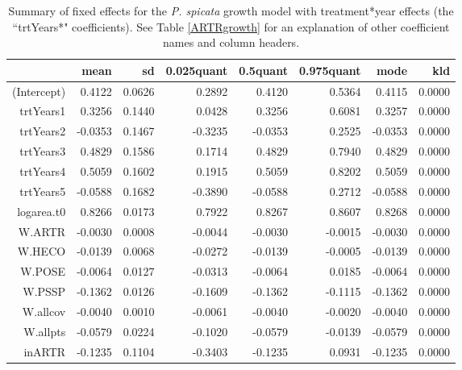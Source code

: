\documentclass[11pt]{article}
\begin{document}
\begin{table}
\centering
\caption{Summary of fixed effects for the \textit{P. spicata} growth model with treatment*year effects (the ``trtYears*" coefficients). See Table \ref{ARTRgrowth} for an explanation of other coefficient names and column headers.} 
\label{table:PSSPgrowth-trtYears}
\begin{tabular}{rrrrrrrr}
  \hline
 & mean & sd & 0.025quant & 0.5quant & 0.975quant & mode & kld \\ 
  \hline
(Intercept) & 0.4122 & 0.0626 & 0.2892 & 0.4120 & 0.5364 & 0.4115 & 0.0000 \\ 
  trtYears1 & 0.3256 & 0.1440 & 0.0428 & 0.3256 & 0.6081 & 0.3257 & 0.0000 \\ 
  trtYears2 & -0.0353 & 0.1467 & -0.3235 & -0.0353 & 0.2525 & -0.0353 & 0.0000 \\ 
  trtYears3 & 0.4829 & 0.1586 & 0.1714 & 0.4829 & 0.7940 & 0.4829 & 0.0000 \\ 
  trtYears4 & 0.5059 & 0.1602 & 0.1915 & 0.5059 & 0.8202 & 0.5059 & 0.0000 \\ 
  trtYears5 & -0.0588 & 0.1682 & -0.3890 & -0.0588 & 0.2712 & -0.0588 & 0.0000 \\ 
  logarea.t0 & 0.8266 & 0.0173 & 0.7922 & 0.8267 & 0.8607 & 0.8268 & 0.0000 \\ 
  W.ARTR & -0.0030 & 0.0008 & -0.0044 & -0.0030 & -0.0015 & -0.0030 & 0.0000 \\ 
  W.HECO & -0.0139 & 0.0068 & -0.0272 & -0.0139 & -0.0005 & -0.0139 & 0.0000 \\ 
  W.POSE & -0.0064 & 0.0127 & -0.0313 & -0.0064 & 0.0185 & -0.0064 & 0.0000 \\ 
  W.PSSP & -0.1362 & 0.0126 & -0.1609 & -0.1362 & -0.1115 & -0.1362 & 0.0000 \\ 
  W.allcov & -0.0040 & 0.0010 & -0.0061 & -0.0040 & -0.0020 & -0.0040 & 0.0000 \\ 
  W.allpts & -0.0579 & 0.0224 & -0.1020 & -0.0579 & -0.0139 & -0.0579 & 0.0000 \\ 
  inARTR & -0.1235 & 0.1104 & -0.3403 & -0.1235 & 0.0931 & -0.1235 & 0.0000 \\ 
   \hline
\end{tabular}
\end{table}
\end{document}
